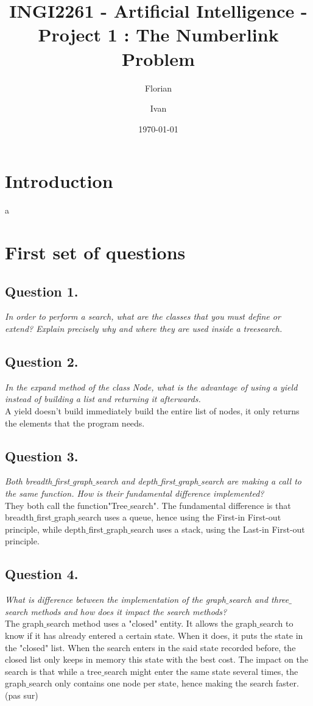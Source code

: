 \documentclass[a4paper, 12pt]{article}
\author{Florian \bsc{Thuin}  \and Ivan \bsc{Ahad}}
\title{INGI2261 - Artificial Intelligence - Project 1 : The Numberlink Problem}
\date{\today}
\begin{document}
\maketitle
\section{Introduction}
a
\section{First set of questions}
\subsection{Question 1.}
\textit{In order to perform a search, what are the classes that you must define or extend? Explain precisely why and where they are used inside a treesearch.}
\subsection{Question 2.}
\textit{In the expand method of the class Node, what is the advantage of using a yield instead of building a list and returning it afterwards.}
\\
A yield doesn't build immediately build the entire list of nodes, it only returns the elements that the program needs. 

\subsection{Question 3.}
\textit{Both breadth$\_$first$\_$graph$\_$search and depth$\_$first$\_$graph$\_$search are making a call to the same function. How is their fundamental difference implemented?}
\\
They both call the function"Tree$\_$search". The fundamental difference is that breadth$\_$first$\_$graph$\_$search uses a queue, hence using the First-in First-out principle, while depth$\_$first$\_$graph$\_$search uses a stack, using the Last-in First-out principle. 

\subsection{Question 4.}
\textit{What is difference between the implementation of the graph$\_$search and three$\_$search methods and how does it impact the search methods?}
\\
The graph$\_$search method uses a "closed" entity. It allows the graph$\_$search to know if it has already entered a certain state. When it does, it puts the state in the "closed" list. When the search enters in the said state recorded before, the closed list only keeps in memory this state with the best cost. The impact on the search is that while a tree$\_$search might enter the same state several times, the graph$\_$search only contains one node per state, hence making the search faster. (pas sur)
\end{document}
